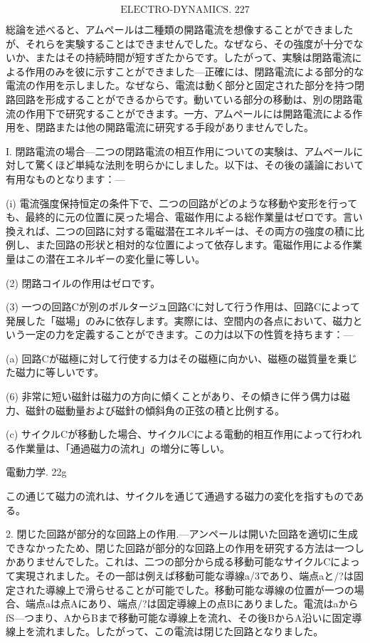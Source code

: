 \documentclass[a4paper,11pt,openany]{ltjsbook}
\begin{document}
$$\text{ELECTRO-DYNAMICS. 227}$$

総論を述べると、アムペールは二種類の開路電流を想像することができましたが、それらを実験することはできませんでした。なぜなら、その強度が十分でないか、またはその持続時間が短すぎたからです。したがって、実験は閉路電流による作用のみを彼に示すことができました—正確には、閉路電流による部分的な電流の作用を示しました。なぜなら、電流は動く部分と固定された部分を持つ閉路回路を形成することができるからです。動いている部分の移動は、別の閉路電流の作用下で研究することができます。一方、アムペールには開路電流による作用を、閉路または他の開路電流に研究する手段がありませんでした。

I. 閉路電流の場合—二つの閉路電流の相互作用についての実験は、アムペールに対して驚くほど単純な法則を明らかにしました。以下は、その後の議論において有用なものとなります：—

(i) 電流强度保持恒定の条件下で、二つの回路がどのような移動や変形を行っても、最終的に元の位置に戻った場合、電磁作用による総作業量はゼロです。言い換えれば、二つの回路に対する電磁潜在エネルギーは、その両方の強度の積に比例し、また回路の形状と相対的な位置によって依存します。電磁作用による作業量はこの潜在エネルギーの変化量に等しい。

(2) 閉路コイルの作用はゼロです。

(3) 一つの回路Cが別のボルタージュ回路Cに対して行う作用は、回路Cによって発展した「磁場」のみに依存します。実際には、空間内の各点において、磁力という一定の力を定義することができます。この力は以下の性質を持ちます：—

(a) 回路Cが磁極に対して行使する力はその磁極に向かい、磁極の磁質量を乗じた磁力に等しいです。

(6) 非常に短い磁針は磁力の方向に傾くことがあり、その傾きに伴う偶力は磁力、磁針の磁動量および磁針の傾斜角の正弦の積と比例する。

(c) サイクルCが移動した場合、サイクルCによる電動的相互作用によって行われる作業量は、「通過磁力の流れ」の増分に等しい。

電動力学. 22g

この通じて磁力の流れは、サイクルを通じて通過する磁力の変化を指すものである。

2. 閉じた回路が部分的な回路上の作用.—アンペールは開いた回路を適切に生成できなかったため、閉じた回路が部分的な回路上の作用を研究する方法は一つしかありませんでした。これは、二つの部分から成る移動可能なサイクルCによって実現されました。その一部は例えば移動可能な導線a/3であり、端点aと/?は固定された導線上で滑らせることが可能でした。移動可能な導線の位置が一つの場合、端点aは点Aにあり、端点/?は固定導線上の点Bにありました。電流はaからfS—つまり、AからBまで移動可能な導線上を流れ、その後BからA沿いに固定導線上を流れました。したがって、この電流は閉じた回路となりました。
\end{document}
